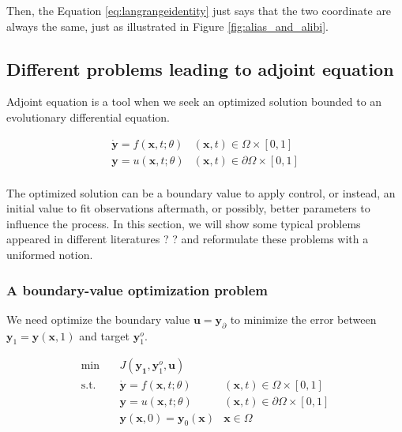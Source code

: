 \documentclass{article}
\begin{document}
Then, the Equation \ref{eq:langrangeidentity} just says that the two coordinate are always the same, just as illustrated in Figure \ref{fig:alias_and_alibi}.

\subsection{Different problems leading to adjoint equation}

Adjoint equation is a tool when we seek an optimized solution bounded to an evolutionary differential equation.

\begin{equation}
\begin{array}{ll}
\dot{\mathbf{y}} = f(\mathbf{x}, t; \theta) & (\mathbf{x}, t) \in \Omega \times [0, 1] \\
\mathbf{y} = u(\mathbf{x}, t; \theta) & (\mathbf{x}, t) \in \partial \Omega \times [0, 1] \\
\end{array}
\end{equation}

The optimized solution can be a boundary value to apply control, or instead, an initial value to fit observations aftermath, or possibly, better parameters to influence the process.
In this section, we will show some typical problems appeared in different literatures ? \cite{Liberzon2012CalculusOV}\cite{hall1983physical}\cite{Errico1997WhatIA} ? and reformulate these problems with a uniformed notion.

\subsubsection{A boundary-value optimization problem}

We need optimize the boundary value $ \mathbf{u} = \mathbf{y}_{\partial} $ to minimize the error between $ \mathbf{y}_1 = \mathbf{y}(\mathbf{x}, 1)$ and target $ \mathbf{y}_1^o $.

$$
\begin{array}{rcll}
\min &~& J(\mathbf{y_1}, \mathbf{y}_1^o, \mathbf{u}) & \\
\mathrm{s.t.} &~& \dot{\mathbf{y}} = f(\mathbf{x}, t; \theta) & (\mathbf{x}, t) \in \Omega \times [0, 1] \\
&~& \mathbf{y} = u(\mathbf{x}, t; \theta) & (\mathbf{x}, t) \in \partial \Omega \times [0, 1] \\
&~& \mathbf{y}(\mathbf{x}, 0) = \mathbf{y}_0(\mathbf{x}) & \mathbf{x} \in \Omega
\end{array}
$$
\end{document}
